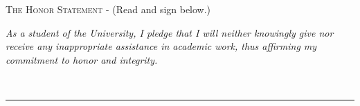 \bigskip

\noindent \textsc{The Honor Statement} - (Read and sign below.)\\
\begin{footnotesize}
\textit{As a student of the University, I pledge that I will neither knowingly give nor receive any inappropriate assistance in academic work, thus affirming my commitment to honor and integrity.}\\
\end{footnotesize}

 \ \rule{8.75 cm}{.01cm}\\

\vfill

\pagebreak
